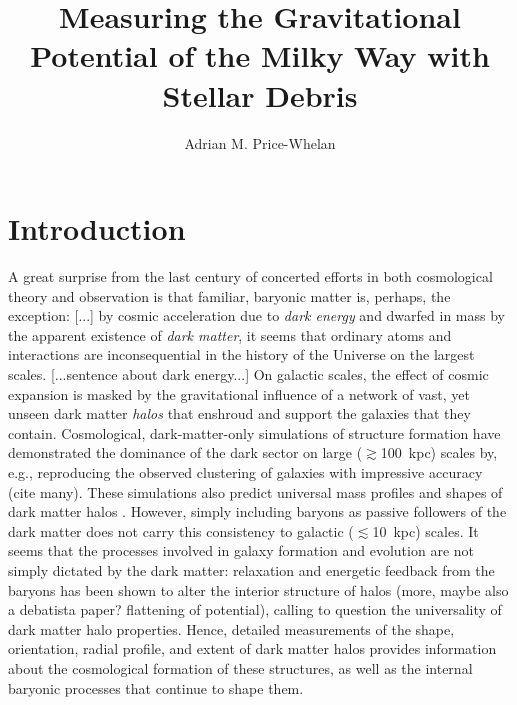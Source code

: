 \documentclass[letterpaper,12pt,preprint]{aastex}
\begin{document}
\title{Measuring the Gravitational Potential of the Milky Way with Stellar Debris}
\author{Adrian M. Price-Whelan}

\section{Introduction}

A great surprise from the last century of concerted efforts in both cosmological theory and observation is that familiar, baryonic matter is, perhaps, the exception: [...] by cosmic acceleration due to \emph{dark energy} and dwarfed in mass by the apparent existence of \emph{dark matter}, it seems that ordinary atoms and interactions are inconsequential in the history of the Universe on the largest scales. [...sentence about dark energy...] On galactic scales, the effect of cosmic expansion is masked by the gravitational influence of a network of vast, yet unseen dark matter \emph{halos} that enshroud and support the galaxies that they contain. Cosmological, dark-matter-only simulations of structure formation have demonstrated the dominance of the dark sector on large ($\gtrsim$100~kpc) scales by, e.g., reproducing the observed clustering of galaxies with impressive accuracy (cite many). These simulations also predict universal mass profiles and shapes of dark matter halos \citep{navarro96, others}. However, simply including baryons as passive followers of the dark matter does not carry this consistency to galactic ($\lesssim$10~kpc) scales. It seems that the processes involved in galaxy formation and evolution are not simply dictated by the dark matter: relaxation and energetic feedback from the baryons has been shown to alter the interior structure of halos \citep[e.g.][]{bailin05, pontzen12} (more, maybe also a debatista paper? flattening of potential), calling to question the universality of dark matter halo properties. Hence, detailed measurements of the shape, orientation, radial profile, and extent of dark matter halos provides information about the cosmological formation of these structures, as well as the internal baryonic processes that continue to shape them.
\end{document}
